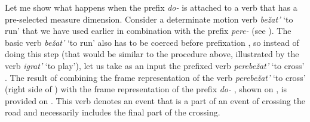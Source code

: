 Let me show what happens when the prefix \textit{do-}   is attached to a verb that has a pre-selected measure dimension. Consider a determinate motion verb \textit{be\v{z}at'} `to run' that we have used earlier in combination with the prefix \textit{pere-}   (see ). The basic verb \textit{be\v{z}at'} `to run' also has to be coerced before prefixation , so instead of doing this step (that would be similar to the procedure above, illustrated by the verb \textit{igrat'} `to play'), let us take as an input the prefixed verb \textit{perebe\v{z}at'} `to cross' . The result of combining the frame representation of the verb \textit{perebe\v{z}at'} `to cross'  (right side of ) with the frame representation of the prefix \textit{do-}  , shown on , is provided on . This verb denotes an event that is a part of an event of crossing the road and necessarily includes the final part of the crossing. 

